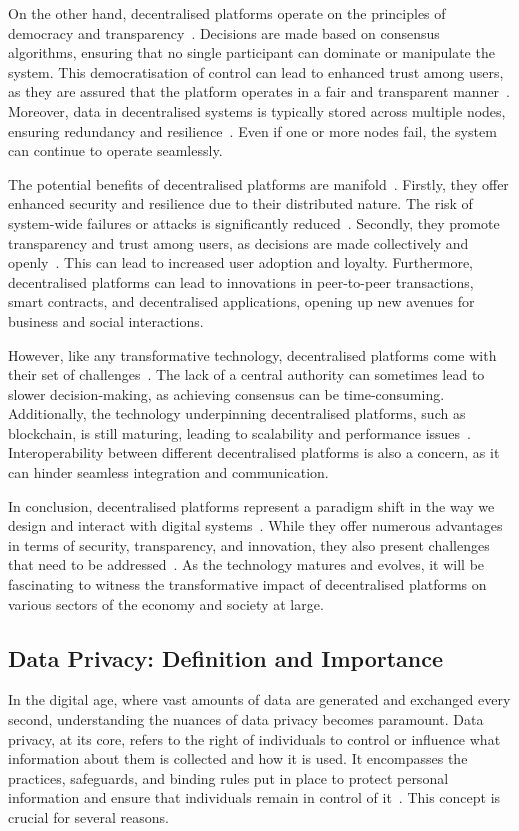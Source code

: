 On the other hand, decentralised platforms operate on the principles of democracy and transparency~\cite{SEFRAOUI.2022}. Decisions are made based on consensus algorithms, ensuring that no single participant can dominate or manipulate the system. This democratisation of control can lead to enhanced trust among users, as they are assured that the platform operates in a fair and transparent manner~\cite{Hasan.2022}. Moreover, data in decentralised systems is typically stored across multiple nodes, ensuring redundancy and resilience~\cite{Hasan.2022}. Even if one or more nodes fail, the system can continue to operate seamlessly.

The potential benefits of decentralised platforms are manifold~\cite{Hasan.2022}. Firstly, they offer enhanced security and resilience due to their distributed nature. The risk of system-wide failures or attacks is significantly reduced~\cite{Maffiola.2022}. Secondly, they promote transparency and trust among users, as decisions are made collectively and openly~\cite{Hasan.2022}. This can lead to increased user adoption and loyalty. Furthermore, decentralised platforms can lead to innovations in peer-to-peer transactions, smart contracts, and decentralised applications, opening up new avenues for business and social interactions.

However, like any transformative technology, decentralised platforms come with their set of challenges~\cite{Hasan.2022}. The lack of a central authority can sometimes lead to slower decision-making, as achieving consensus can be time-consuming. Additionally, the technology underpinning decentralised platforms, such as blockchain, is still maturing, leading to scalability and performance issues~\cite{Hasan.2022}. Interoperability between different decentralised platforms is also a concern, as it can hinder seamless integration and communication.

In conclusion, decentralised platforms represent a paradigm shift in the way we design and interact with digital systems~\cite{Tverdokhlib.2022}. While they offer numerous advantages in terms of security, transparency, and innovation, they also present challenges that need to be addressed~\cite{Hasan.2022}. As the technology matures and evolves, it will be fascinating to witness the transformative impact of decentralised platforms on various sectors of the economy and society at large.


\subsection{Data Privacy: Definition and Importance}
In the digital age, where vast amounts of data are generated and exchanged every second, understanding the nuances of data privacy becomes paramount. Data privacy, at its core, refers to the right of individuals to control or influence what information about them is collected and how it is used. It encompasses the practices, safeguards, and binding rules put in place to protect personal information and ensure that individuals remain in control of it~\cite{Covert.2020}. This concept is crucial for several reasons.

